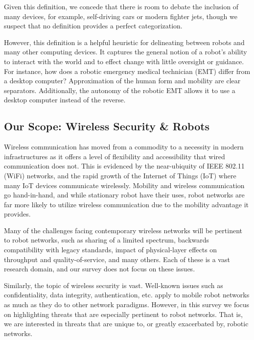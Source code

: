Given this definition, we concede that there is room to debate the inclusion of many devices, for example, self-driving cars or modern fighter jets, though we suspect that no definition provides a perfect categorization.

However, this definition is a helpful heuristic for delineating between robots and many other computing devices. It captures the general notion of a robot's ability to interact with the world and to effect change with little oversight or guidance. For instance, how does a robotic emergency medical technician (EMT) differ from a desktop computer? Approximation of the human form and mobility are clear separators. Additionally, the autonomy of the robotic EMT allows it to use a desktop computer instead of the reverse.



\subsection{Our Scope: Wireless Security \& Robots}
 
Wireless communication has moved from a commodity to a necessity in modern infrastructures as it offers a level of flexibility and accessibility that wired communication does not. This is evidenced by the near-ubiquity of IEEE 802.11 (WiFi) networks, and the rapid growth of the Internet of Things (IoT) where many IoT devices communicate wirelessly. Mobility and wireless communication go hand-in-hand, and while stationary robot have their uses, robot networks are far more likely to utilize wireless communication due to the mobility advantage it provides.

Many of the challenges facing contemporary wireless networks will be pertinent to robot networks, such as sharing of a limited spectrum, backwards compatibility with legacy standards, impact of physical-layer effects on throughput and quality-of-service, and many others. Each of these is a vast research domain, and our survey does not focus on these issues.

Similarly, the topic of wireless security is vast. Well-known issues such as confidentiality, data integrity, authentication, etc. apply to mobile robot networks as much as they do to other network paradigms. However, in this survey we focus on highlighting threats that are especially pertinent to robot networks. That is, we are interested in threats that are unique to, or greatly exacerbated by, robotic networks. 

